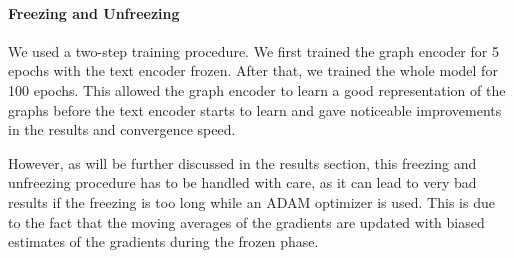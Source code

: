\documentclass[switch, 12pt]{article}
\begin{document}
\begin{multicols}{2}
    \paragraph*{Freezing and Unfreezing}
    We used a two-step training procedure. We first trained the graph encoder for 5 epochs with the text encoder frozen. After that, we trained the whole model for 100 epochs. This allowed the graph encoder to learn a good representation of the graphs before the text encoder starts to learn and gave noticeable improvements in the results and convergence speed.

    However, as will be further discussed in the results section, this freezing and unfreezing procedure has to be handled with care, as it can lead to very bad results if the freezing is too long while an ADAM optimizer is used. This is due to the fact that the moving averages of the gradients are updated with biased estimates of the gradients during the frozen phase.



\end{multicols}
\end{document}

